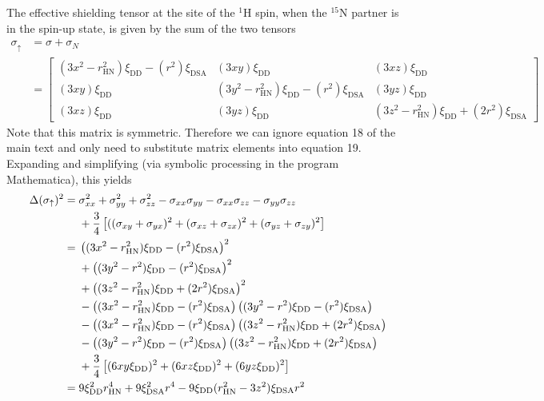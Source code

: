 \documentclass[a4paper,10pt,english,openany,oneside]{sphinxmanual}
\begin{document}
The effective shielding tensor at the site of the $^{\text{1}}$H spin, when the $^{\text{15}}$N partner is in the spin-up state, is given by the sum of the two tensors
\begin{equation*}
\begin{split}\sigma_\uparrow &= \sigma + \sigma_N\\
&=
\begin{bmatrix}
(3x^2-r_\text{HN}^2)\xi_\text{DD} -(r^2)\xi_\text{DSA}  & (3xy)\xi_\text{DD} & (3xz)\xi_\text{DD}\\
(3xy)\xi_\text{DD} & (3y^2-r_\text{HN}^2)\xi_\text{DD} -(r^2)\xi_\text{DSA} & (3yz)\xi_\text{DD}\\
(3xz)\xi_\text{DD} & (3yz)\xi_\text{DD} & (3z^2 - r_\text{HN}^2)\xi_\text{DD} +(2r^2)\xi_\text{DSA}
\end{bmatrix}\end{split}
\end{equation*}
Note that this matrix is symmetric. Therefore we can ignore equation 18 of the main text and only need to substitute matrix elements into equation 19. Expanding and simplifying (via symbolic processing in the program Mathematica), this yields
\begin{equation*}
\begin{split}\Delta(\sigma_\uparrow)^2={}& \sigma_{xx}^2+\sigma_{yy}^2+\sigma_{zz}^2
-\sigma_{xx}\sigma_{yy}-\sigma_{xx}\sigma_{zz}-\sigma_{yy}\sigma_{zz} \notag\\
&+\frac{3}{4}\left[
((\sigma_{xy}+\sigma_{yx})^2 + (\sigma_{xz}+\sigma_{zx})^2 + (\sigma_{yz}+\sigma_{zy})^2\right]\\
={}&
\left((3x^2-r_\text{HN}^2)\xi_\text{DD} -(r^2)\xi_\text{DSA}\right)^2 \notag\\
&+\left((3y^2-r^2)\xi_\text{DD} -(r^2)\xi_\text{DSA}\right)^2 \notag\\
&+\left((3z^2 - r_\text{HN}^2)\xi_\text{DD} +(2r^2)\xi_\text{DSA}\right)^2 \notag\\
&-\left((3x^2-r_\text{HN}^2)\xi_\text{DD} -(r^2)\xi_\text{DSA}\right)
\left((3y^2-r^2)\xi_\text{DD} -(r^2)\xi_\text{DSA}\right) \notag\\
&-\left((3x^2-r_\text{HN}^2)\xi_\text{DD} -(r^2)\xi_\text{DSA}\right)
\left((3z^2 - r_\text{HN}^2)\xi_\text{DD} +(2r^2)\xi_\text{DSA}\right) \notag\\
&-\left((3y^2-r^2)\xi_\text{DD} -(r^2)\xi_\text{DSA}\right)
\left((3z^2 - r_\text{HN}^2)\xi_\text{DD} +(2r^2)\xi_\text{DSA}\right) \notag\\
&+\frac{3}{4}\left[
(6xy\xi_\text{DD})^2
+ (6xz\xi_\text{DD})^2
+ (6yz\xi_\text{DD})^2
\right]\\
={}& 9\xi_\text{DD}^2r_\text{HN}^4 + 9\xi_\text{DSA}^2r^4 -
9\xi_\text{DD}(r_\text{HN}^2-3z^2)\xi_\text{DSA}r^2\end{split}
\end{equation*}
\end{document}
